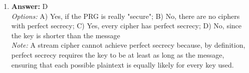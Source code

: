 \documentclass[12pt]{article}
\begin{document}
\begin{enumerate}[label=\arabic*.]
\\ \textit{Note:} The Tor browser is specifically designed to facilitate anonymous browsing and access to the Tor network, enabling users to utilize various Tor services securely.
\item \textbf{Answer:} D
\\ \textit{Options:} A) Yes, if the PRG is really "secure"; B) No, there are no ciphers with perfect secrecy; C) Yes, every cipher has perfect secrecy; D) No, since the key is shorter than the message
\\ \textit{Note:} A stream cipher cannot achieve perfect secrecy because, by definition, perfect secrecy requires the key to be at least as long as the message, ensuring that each possible plaintext is equally likely for every key used.
\end{enumerate}
\end{document}
